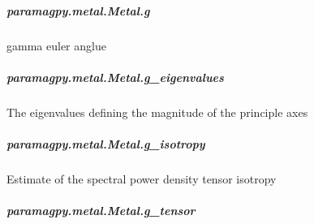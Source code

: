 \documentclass[a4paper,10pt,english,openany,oneside]{sphinxmanual}
\begin{document}
\begin{fulllineitems}
\begin{fulllineitems}
\subparagraph{paramagpy.metal.Metal.g}
\label{\detokenize{reference/generated/paramagpy.metal.Metal.g:paramagpy-metal-metal-g}}\label{\detokenize{reference/generated/paramagpy.metal.Metal.g::doc}}

\begin{fulllineitems}
\label{\detokenize{reference/generated/paramagpy.metal.Metal.g:paramagpy.metal.Metal.g}}
gamma euler anglue

\end{fulllineitems}



\subparagraph{paramagpy.metal.Metal.g\_eigenvalues}
\label{\detokenize{reference/generated/paramagpy.metal.Metal.g_eigenvalues:paramagpy-metal-metal-g-eigenvalues}}\label{\detokenize{reference/generated/paramagpy.metal.Metal.g_eigenvalues::doc}}

\begin{fulllineitems}
\label{\detokenize{reference/generated/paramagpy.metal.Metal.g_eigenvalues:paramagpy.metal.Metal.g_eigenvalues}}
The eigenvalues defining the magnitude of the principle axes

\end{fulllineitems}



\subparagraph{paramagpy.metal.Metal.g\_isotropy}
\label{\detokenize{reference/generated/paramagpy.metal.Metal.g_isotropy:paramagpy-metal-metal-g-isotropy}}\label{\detokenize{reference/generated/paramagpy.metal.Metal.g_isotropy::doc}}

\begin{fulllineitems}
\label{\detokenize{reference/generated/paramagpy.metal.Metal.g_isotropy:paramagpy.metal.Metal.g_isotropy}}
Estimate of the spectral power density tensor isotropy

\end{fulllineitems}



\subparagraph{paramagpy.metal.Metal.g\_tensor}
\label{\detokenize{reference/generated/paramagpy.metal.Metal.g_tensor:paramagpy-metal-metal-g-tensor}}\label{\detokenize{reference/generated/paramagpy.metal.Metal.g_tensor::doc}}


\end{fulllineitems}
\end{fulllineitems}
\end{document}
